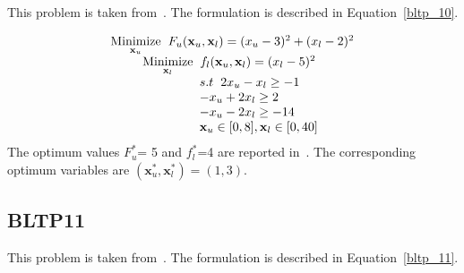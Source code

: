 This problem is taken from~\cite{rajesh2003tabu}. The formulation is described in Equation~\ref{bltp_10}.

\begin{equation}
\begin{array}{lr}
\underset{\mathbf{x}_u}{\text{Minimize}}\hspace{2mm} F_u(\mathbf{x}_u, \mathbf{ x}_l)=(x_u-3)^2+(x_l-2)^2\\


\hspace{9mm} \underset{\mathbf{x}_l} {\text{Minimize}}\hspace{2mm} f_l(\mathbf{x}_u, \mathbf{ x}_l)=(x_l-5)^2 \\
\hspace{25mm}s.t\hspace{2mm} 2x_u-x_l\geq -1\\
\hspace{25mm}  -x_u+2x_l \geq 2\\
\hspace{25mm}  -x_u-2x_l \geq -14\\
\hspace{25mm} \mathbf{x}_u \in {[0,8]},\mathbf{x}_l \in [0,40] \\
\end{array}
\label{bltp_10}
\end{equation}
The optimum values $F_u^*$= 5 and  $f_l^*$=4 are reported in~\cite{Angelobilevel}. The corresponding optimum variables are $(\mathbf{x}^*_u, \mathbf{x}^*_l)=(1,3)$.

\subsection{BLTP11}

This problem is taken from~\cite{rajesh2003tabu}. The formulation is described in Equation~\ref{bltp_11}.

